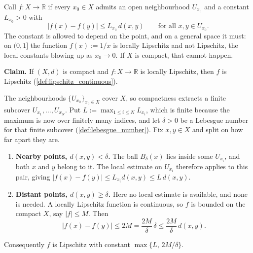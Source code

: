 \begin{example}
\label{ex:locally_lipschitz_is_lipschitz}
Call $f : X \to \mathbb{R}$   if
every $x_0 \in X$ admits an open neighbourhood $U_{x_0}$ and a constant $L_{x_0} > 0$ with
\[\lvert f(x)-f(y)\rvert \le L_{x_0}\,d(x,y) \qquad \text{for all } x,y \in U_{x_0}.\]
The constant is allowed to depend on the point, and on a general space it must: on $(0,1]$ the
function $f(x) := 1/x$ is locally Lipschitz and not Lipschitz, the local constants blowing up as
$x_0 \to 0$. If $X$ is compact, that cannot happen.

\textbf{Claim.} If $(X,d)$ is compact and $f : X \to \mathbb{R}$ is locally Lipschitz, then $f$ is
Lipschitz (\cref{def:lipschitz_continuous}).

The neighbourhoods $\{U_{x_0}\}_{x_0 \in X}$ cover $X$, so compactness extracts a finite subcover
$U_{x_1},\dots,U_{x_N}$. Put $L := \max_{1\le i\le N} L_{x_i}$, which is finite because the maximum
is now over finitely many indices, and let $\delta > 0$ be a Lebesgue number for that finite
subcover (\cref{def:lebesgue_number}). Fix $x,y \in X$ and split on how far apart they are.

\begin{enumerate}[label=\textbf{(\alph*)}]
  \item \textbf{Nearby points, $d(x,y) < \delta$.} The ball $B_\delta(x)$ lies inside some
    $U_{x_i}$, and both $x$ and $y$ belong to it. The local estimate on $U_{x_i}$ therefore
    applies to this pair, giving $\lvert f(x)-f(y)\rvert \le L_{x_i}d(x,y) \le L\,d(x,y)$.
  \item \textbf{Distant points, $d(x,y) \ge \delta$.} Here no local estimate is available, and
    none is needed. A locally Lipschitz function is continuous, so $f$ is bounded on the compact
    $X$, say $\lvert f\rvert \le M$. Then
    \[\lvert f(x)-f(y)\rvert \le 2M = \frac{2M}{\delta}\,\delta \le \frac{2M}{\delta}\,d(x,y).\]
\end{enumerate}

Consequently $f$ is Lipschitz with constant $\max\{L,\,2M/\delta\}$.


\end{example}
